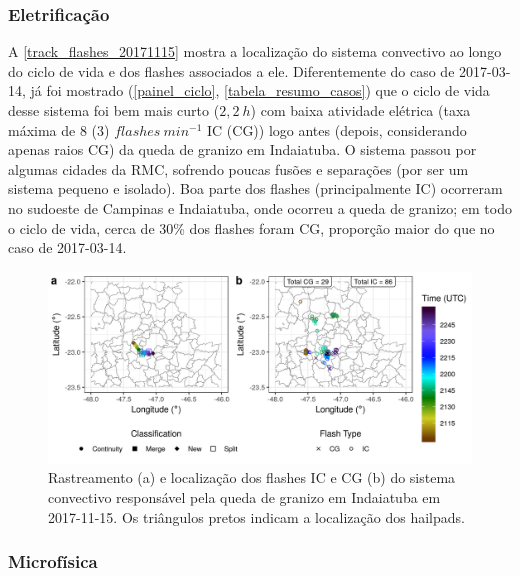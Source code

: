 \subsubsection{Eletrificação}\label{elec_20171115}

A \autoref{track_flashes_20171115} mostra a localização do sistema convectivo ao longo do ciclo de vida e dos flashes associados a ele. Diferentemente do caso de 2017-03-14, já foi mostrado (\autoref{painel_ciclo}, \autoref{tabela_resumo_casos}) que o ciclo de vida desse sistema foi bem mais curto ($2,2\:h$) com baixa atividade elétrica (taxa máxima de 8 (3) $flashes\:min^{-1}$ IC (CG)) logo antes (depois, considerando apenas raios CG) da queda de granizo em Indaiatuba. O sistema passou por algumas cidades da RMC, sofrendo poucas fusões e separações (por ser um sistema pequeno e isolado). Boa parte dos flashes (principalmente IC) ocorreram no sudoeste de Campinas e Indaiatuba, onde ocorreu a queda de granizo; em todo o ciclo de vida, cerca de 30\% dos flashes foram CG, proporção maior do que no caso de 2017-03-14.

\begin{figure}[htb]
	\begin{center}
		\caption{Rastreamento (a) e localização dos flashes IC e CG (b) do sistema convectivo responsável pela queda de granizo em Indaiatuba em 2017-11-15. Os triângulos pretos indicam a localização dos hailpads.} 
		\label{track_flashes_20171115}
		\includegraphics[width=\columnwidth]{../General_Processing/figures/track_flashes_20171115.png}
	\end{center}
\end{figure}

\subsubsection{Microfísica}\label{micro_20171115}

